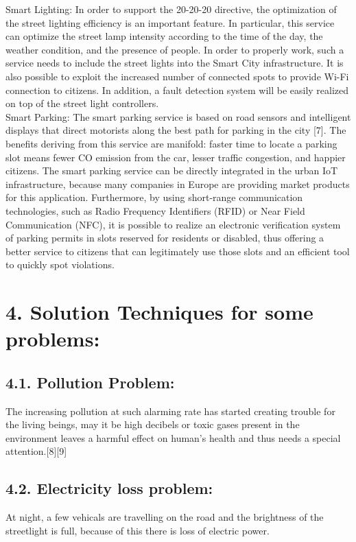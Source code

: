 \documentclass[a4paper]{report}
\begin{document}
	Smart Lighting: In order to support the 20-20-20 directive, the
	optimization of the street lighting efficiency is an important
	feature. In particular, this service can optimize the street lamp
	intensity according to the time of the day, the weather condition,
	and the presence of people. In order to properly work, such a
	service needs to include the street lights into the Smart City
	infrastructure. It is also possible to exploit the increased number
	of connected spots to provide Wi-Fi connection to citizens. In
	addition, a fault detection system will be easily realized on top of
	the street light controllers.\\
	Smart Parking: The smart parking service is based on road
	sensors and intelligent displays that direct motorists along the best path for parking in the city [7]. The benefits deriving from
	this service are manifold: faster time to locate a parking slot
	means fewer CO emission from the car, lesser traffic congestion,
	and happier citizens. The smart parking service can be directly
	integrated in the urban IoT infrastructure, because many
	companies in Europe are providing market products for this
	application. Furthermore, by using short-range communication
	technologies, such as Radio Frequency Identifiers (RFID) or
	Near Field Communication (NFC), it is possible to realize an
	electronic verification system of parking permits in slots reserved
	for residents or disabled, thus offering a better service to citizens
	that can legitimately use those slots and an efficient tool to
	quickly spot violations.\\
	\section*{4. Solution Techniques for some problems:}
	
	\subsection*{4.1. Pollution Problem:}
	The increasing pollution at such alarming rate has started creating trouble for the living beings, may it be high
	decibels or toxic gases present in the environment leaves a harmful effect on human’s health and thus needs a
	special attention.[8][9]
	
	\subsection*{4.2. Electricity loss problem:}
	At night, a few vehicals are travelling on the road and the brightness of the streetlight is full, because of this
	there is loss of electric power. 
	
\end{document}
